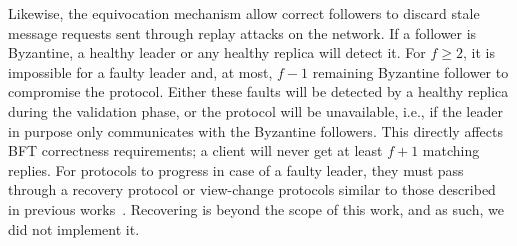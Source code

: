 Likewise, the equivocation mechanism allow correct followers to discard stale message requests sent through replay attacks on the network. If a follower is Byzantine, a healthy leader or any healthy replica will detect it. For $f\geq2$, it is impossible for a faulty leader and, at most, $f-1$ remaining Byzantine follower to compromise the protocol. Either these faults will be detected by a healthy replica during the validation phase, or the protocol will be unavailable, i.e., if the leader in purpose only communicates with the Byzantine followers. This directly affects BFT correctness requirements; a client will never get at least $f+1$ matching replies. For protocols to progress in case of a faulty leader, they must pass through a recovery protocol or view-change protocols similar to those described in previous works~\cite{minBFT, Castro:2002}. Recovering is beyond the scope of this work, and as such, we did not implement it.


\noindent{}




